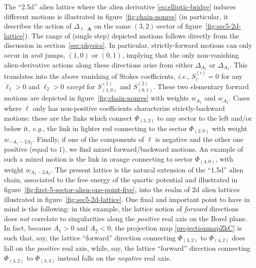 \documentclass[11pt,a4paper]{article}
\begin{document}
The ``2.5d'' alien lattice where the alien derivative \eqref{eq:elliptic-bridge} induces different motions is illustrated in figure~\ref{fig:chain-nonres} (in particular, it describes the action of $\Delta_{\boldsymbol{\ell} \cdot \boldsymbol{A}}$ on the same $(3,2)$-sector of figure~\ref{fig:sec5-2d-lattice}). The range of (single step) depicted motions follows directly from the discussion in section~\ref{sec:physics}. In particular, strictly-forward motions can only occur in \textit{unit} jumps, $(1,0)$ or $(0,1)$, implying that the only non-vanishing alien-derivative actions along these directions arise from either $\Delta_{A_1}$ or $\Delta_{A_2}$. This translates into the above vanishing of Stokes coefficients, \textit{i.e.}, $S^{(i)}_{\boldsymbol{\ell}} = 0$ for any $\ell_1>0$ and $\ell_2>0$ \textit{except} for $S^{(1)}_{(1,0)}$ and $S^{(2)}_{(0,1)}$. These two elementary forward motions are depicted in figure~\ref{fig:chain-nonres} with weights $w_{A_1}$ and $w_{A_2}$. Cases where $\boldsymbol{\ell}$ only has non-positive coefficients characterize strictly-backward motions: these are the links which connect $\Phi_{(3,2)}$ to any sector to the left and/or below it, \textit{e.g.}, the link in lighter red connecting to the sector $\Phi_{(2,0)}$ with weight $w_{-A_1-2A_2}$. Finally, if one of the components of $\boldsymbol{\ell}$ is negative and the other one positive (equal to $1$), we find mixed forward/backward motions. An example of such a mixed motion is the link in orange connecting to sector $\Phi_{(4,0)}$, with weight $w_{A_1-2A_2}$. The present lattice is the natural extension of the ``1.5d'' alien chain, associated to the free energy of the quartic potential and illustrated in figure~\ref{fig:first-5-sector-alien-one-point-five}, into the realm of 2d alien lattices illustrated in figure~\ref{fig:sec5-2d-lattice}. One final and important point to have in mind is the following: in this example, the lattice notion of \textit{forward} directions does \textit{not} correlate to singularities along the \textit{positive} real axis on the Borel plane. In fact, because $A_1>0$ and $A_2<0$, the projection map \eqref{projectionmapZkC} is such that, say, the lattice ``forward'' direction connecting $\Phi_{(3,2)}$ to $\Phi_{(4,2)}$ does fall on the \textit{positive} real axis, while, say, the lattice ``forward'' direction connecting $\Phi_{(3,2)}$ to $\Phi_{(3,3)}$ instead falls on the \textit{negative} real axis.
\end{document}
